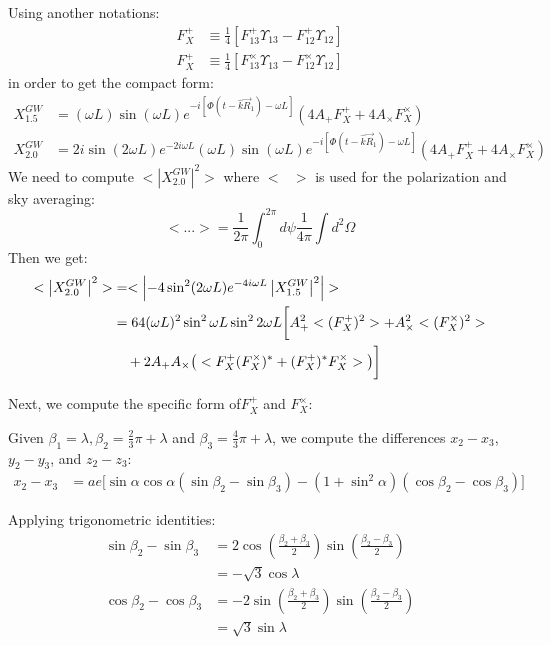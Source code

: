 \documentclass{article}
\begin{document}
	Using another notations:
	\begin{align}
		\label{f+x}
		F^{+}_{X} &\equiv \frac{1}{4} [F^{+}_{13} \Upsilon_{13} - F^{+}_{12} \Upsilon_{12}] \\
		\label{fxx}
		F^{+}_{X} &\equiv \frac{1}{4} [F^{\times}_{13} \Upsilon_{13} - F^{\times}_{12} \Upsilon_{12}]
	\end{align}
	in order to get the compact form:
	\begin{align}
		X^{GW}_{1.5} &= (\omega L) \sin(\omega L) e^{-i[\Phi(t-\hat{k}\vec{R}_1)-\omega L]} (4A_+F^{+}_{X}  + 4A_{\times}F^{\times}_{X} ) \\
		X^{GW}_{2.0} &= 2i \sin(2\omega L) e^{-2i\omega L} (\omega L) \sin(\omega L) e^{-i[\Phi(t-\hat{k}\vec{R}_1)-\omega L]} (4A_+F^{+}_{X}  + 4A_{\times}F^{\times}_{X} ) 
	\end{align}
	We need to compute $<\left|X^{GW}_{2.0}\right|^2>$ where $<~~~>$ is used for the polarization and sky averaging:
	\begin{equation}
		<...> = \frac{1}{2\pi} \int_{0}^{2\pi} d\psi \frac{1}{4 \pi} \int d^2 \Omega
	\end{equation}
	Then we get:
	\begin{align}
		<\left|X^{GW}_{2.0}\right|^2> 
		&= <\left|-4 \sin^2(2\omega L) e^{-4i\omega L} \left| X^{GW}_{1.5}\right|^2 \right| > \notag \\
		\label{X2.0}
		&= 64 (\omega L)^2 \sin^2 \omega L \sin^2 2 \omega L \bigg[
		A^2_{+} <(F^{+}_{X})^{2}> 
		+ A^2_{\times} <(F^{\times}_{X})^{2}> \notag \\
		&\quad + 2A_+ A_{\times} \big(
		<F^{+}_{X} (F^{\times}_{X})^{*}
		+ (F^{+}_{X})^{*} F^{\times}_{X}>
		\big) \bigg]
	\end{align}
	
	Next, we compute the specific form of$F^{+}_{X}$ and $F^{\times}_{X}$:
	
	Given $\beta_1 = \lambda, \beta_2 = \frac{2}{3}\pi + \lambda$ and $\beta_3 = \frac{4}{3}\pi + \lambda$, we compute the differences $x_2 - x_3$, $y_2 - y_3$, and $z_2 - z_3$:
	\begin{align}
		x_2 - x_3 &= a e \Big[ \sin\alpha\cos\alpha(\sin\beta_2 - \sin\beta_3) - (1 + \sin^2\alpha)(\cos\beta_2 - \cos\beta_3) \Big]
	\end{align}
	
	Applying trigonometric identities:
	\begin{align}
		\sin\beta_2 - \sin\beta_3 &= 2\cos\left(\frac{\beta_2+\beta_3}{2}\right)\sin\left(\frac{\beta_2-\beta_3}{2}\right) \\
		&= -\sqrt{3}\cos\lambda \\
		\cos\beta_2 - \cos\beta_3 &= -2\sin\left(\frac{\beta_2+\beta_3}{2}\right)\sin\left(\frac{\beta_2-\beta_3}{2}\right) \\
		&= \sqrt{3}\sin\lambda
	\end{align}
	
\end{document}
